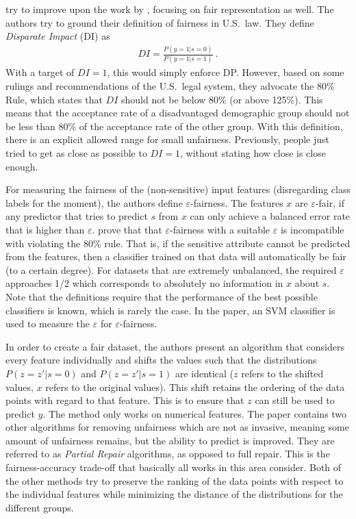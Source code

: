 \citet{feldman2015certifying} try to improve upon the work by \citet{zemel2013learning},
focusing on fair representation as well.
The authors try to ground their definition of fairness in U.S.\ law.
They define \emph{Disparate Impact} (DI) as
\begin{align}
  \label{eq:disparate-impace}
  DI = \frac{P(y=1|s=0)}{P(y=1|s=1)} ~.
\end{align}
With a target of \(DI = 1\), this would simply enforce \ac{DP}.
However, based on some rulings and recommendations of the U.S.\ legal system,
they advocate the 80\% Rule, which states that \(DI\) should not be below 80\% (or above 125\%).
This means that the acceptance rate of a disadvantaged demographic group
should not be less than 80\% of the acceptance rate of the other group.
With this definition, there is an explicit allowed range for small unfairness.
Previously, people just tried to get as close as possible to \(DI = 1\),
without stating how close is close enough.

For measuring the fairness of the (non-sensitive) input features
(disregarding class labels for the moment), the authors define \(\varepsilon\)-fairness.
The features \(x\) are \(\varepsilon\)-fair,
if any predictor that tries to predict \(s\) from \(x\) can only achieve a balanced error rate
that is higher than \(\varepsilon\).
\citet{feldman2015certifying} prove that that \(\varepsilon\)-fairness with a suitable \(\varepsilon\)
is incompatible with violating the 80\% rule.
That is, if the sensitive attribute cannot be predicted from the features,
then a classifier trained on that data will automatically be fair (to a certain degree).
For datasets that are extremely unbalanced,
the required \(\varepsilon\) approaches 1/2
which corresponds to absolutely no information in \(x\) about \(s\).
Note that the definitions require that the performance of the best possible classifiers is known,
which is rarely the case.
In the paper, an \ac{SVM} classifier is used to measure the \(\varepsilon\) for \(\varepsilon\)-fairness.

In order to create a fair dataset,
the authors present an algorithm that considers every feature individually
and shifts the values such that the distributions \(P(z=z'|s=0)\) and \(P(z=z'|s=1)\) are identical
(\(z\) refers to the shifted values, \(x\) refers to the original values).
This shift retains the ordering of the data points with regard to that feature.
This is to ensure that \(z\) can still be used to predict \(y\).
The method only works on numerical features.
The paper contains two other algorithms for removing unfairness which are not as invasive,
meaning some amount of unfairness remains, but the ability to predict is improved.
They are referred to as \emph{Partial Repair} algorithms, as opposed to full repair.
This is the fairness-accuracy trade-off that basically all works in this area consider.
Both of the other methods try to preserve the ranking of the data points
with respect to the individual features
while minimizing the distance of the distributions for the different groups.

